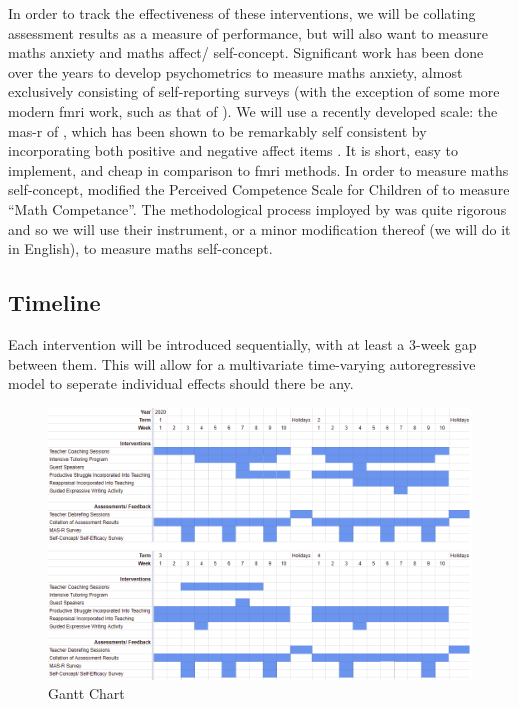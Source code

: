 \documentclass[14pt]{memoir}
\begin{document}
In order to track the effectiveness of these interventions, we will be collating assessment results as a measure of performance, but will also want to measure maths anxiety and maths affect/ self-concept. Significant work has been done over the years to develop psychometrics to measure maths anxiety, almost exclusively consisting of self-reporting surveys (with the exception of some more modern \gls{fmri} work, such as that of ). We will use a recently developed scale: the \gls{mas-r} of , which has been shown to be remarkably self consistent by incorporating both positive and negative affect items \cite{Bai2011}. It is short, easy to implement, and cheap in comparison to \gls{fmri} methods. In order to measure maths self-concept,  modified the Perceived Competence Scale for Children of  to measure ``Math Competance''. The methodological process imployed by  was quite rigorous and so we will use their instrument, or a minor modification thereof (we will do it in English), to measure maths self-concept.



\subsection*{Timeline}

Each intervention will be introduced sequentially, with at least a 3-week gap between them. This will allow for a multivariate time-varying autoregressive model to seperate individual effects should there be any. 

 \begin{figure}
 \includegraphics[scale=0.7]{Gantt_Chart.PNG}
\caption{Gantt Chart \label{fig:gantt}}
\end{figure}
\end{document}
